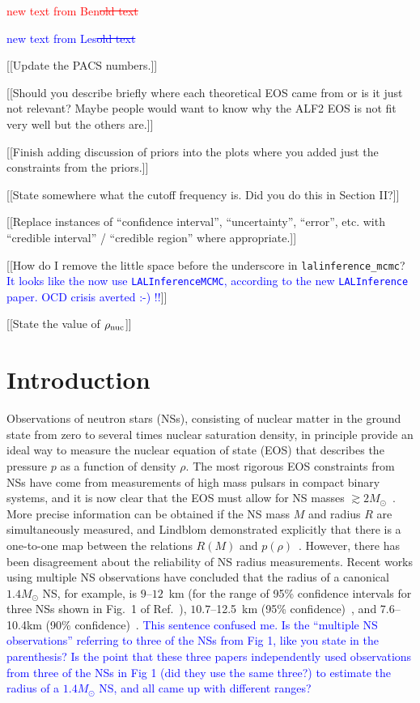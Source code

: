 \documentclass[twocolumn,prd,amssymb,aps,nofootinbib,showpacs,epsf]{revtex4}
\newcommand\ben[2]{\textcolor{red}{{#1}\sout{#2}}}
\newcommand\les[2]{\textcolor{blue}{{#1}\sout{#2}}}
\begin{document}
\maketitle

\ben{new text from Ben}{old text}

\les{new text from Les}{old text}

[[Update the PACS numbers.]]

[[Should you describe briefly where each theoretical EOS came from or is it just not relevant? Maybe people would want to know why the ALF2 EOS is not fit very well but the others are.]]

[[Finish adding discussion of priors into the plots where you added just the constraints from the priors.]]

[[State somewhere what the cutoff frequency is. Did you do this in Section II?]]

[[Replace instances of ``confidence interval'', ``uncertainty'', ``error'', etc. with ``credible interval'' / ``credible region'' where appropriate.]]

[[How do I remove the little space before the underscore in \texttt{lalinference\_mcmc}? \les{It looks like the now use \texttt{LALInferenceMCMC}, according to the new \texttt{LALInference} paper. OCD crisis averted :-) !!}{}]]

[[State the value of $\rho_{\rm nuc}$]]

\section{Introduction}

Observations of neutron stars (NSs), consisting of nuclear matter in the ground state from zero to several times nuclear saturation density, in principle provide an ideal way to measure the nuclear equation of state (EOS) that describes the pressure $p$ as a function of density $\rho$. The most rigorous EOS constraints from NSs have come from measurements of high mass pulsars in compact binary systems, and it is now clear that the EOS must allow for NS masses $\gtrsim 2 M_\odot$~\cite{DemorestPennucciRansom2010, AntoniadisFreireWex2013}. More precise information can be obtained if the NS mass $M$ and radius $R$ are simultaneously measured, and Lindblom demonstrated explicitly that there is a one-to-one map between the relations $R(M)$ and $p(\rho)$~\cite{Lindblom1992}. However, there has been disagreement about the reliability of NS radius measurements. Recent works using multiple NS observations have concluded that the radius of a canonical $1.4M_\odot$ NS, for example, is $9$--$12$~km (for the range of 95\% confidence intervals for three NSs shown in Fig.~1 of Ref.~\cite{OzelBaymGuver2010}), $10.7$--12.5~km (95\% confidence)~\cite{SteinerLattimerBrown2010}, and 7.6--10.4km (90\% confidence)~\cite{GuillotServillatWebb2013}. \les{This sentence confused me.  Is the ``multiple NS observations'' referring to three of the NSs from Fig 1, like you state in the parenthesis?  Is the point that these three papers independently used observations from three of the NSs in Fig 1 (did they use the same three?) to estimate the radius of a $1.4M_\odot$ NS, and all came up with different ranges?}{}
\end{document}
